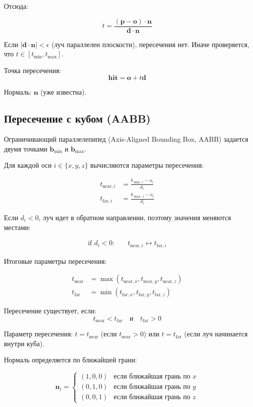 \documentclass[14pt, a4paper]{extarticle}
\begin{document}
Отсюда:

\[
t = \frac{(\mathbf{p} - \mathbf{o}) \cdot \mathbf{n}}{\mathbf{d} \cdot \mathbf{n}}
\]

Если $|\mathbf{d} \cdot \mathbf{n}| < \epsilon$ (луч параллелен плоскости), пересечения нет. Иначе проверяется, что $t \in [t_{\min}, t_{\max}]$.

Точка пересечения:
\[
\mathbf{hit} = \mathbf{o} + t\mathbf{d}
\]

Нормаль: $\mathbf{n}$ (уже известна).

\subsection{Пересечение с кубом (AABB)}

Ограничивающий параллелепипед (Axis-Aligned Bounding Box, AABB) задается двумя точками $\mathbf{b}_{\min}$ и $\mathbf{b}_{\max}$.

Для каждой оси $i \in \{x, y, z\}$ вычисляются параметры пересечения:

\begin{align}
t_{\text{near},i} &= \frac{b_{\min,i} - o_i}{d_i} \\
t_{\text{far},i} &= \frac{b_{\max,i} - o_i}{d_i}
\end{align}

Если $d_i < 0$, луч идет в обратном направлении, поэтому значения меняются местами:

\begin{align}
\text{if } d_i < 0: \quad &t_{\text{near},i} \leftrightarrow t_{\text{far},i}
\end{align}

Итоговые параметры пересечения:

\begin{align}
t_{\text{near}} &= \max(t_{\text{near},x}, t_{\text{near},y}, t_{\text{near},z}) \\
t_{\text{far}} &= \min(t_{\text{far},x}, t_{\text{far},y}, t_{\text{far},z})
\end{align}

Пересечение существует, если:
\[
t_{\text{near}} < t_{\text{far}} \quad \text{и} \quad t_{\text{far}} > 0
\]

Параметр пересечения: $t = t_{\text{near}}$ (если $t_{\text{near}} > 0$) или $t = t_{\text{far}}$ (если луч начинается внутри куба).

Нормаль определяется по ближайшей грани:

\[
\mathbf{n}_i = \begin{cases}
(1, 0, 0) & \text{если ближайшая грань по } x \\
(0, 1, 0) & \text{если ближайшая грань по } y \\
(0, 0, 1) & \text{если ближайшая грань по } z
\end{cases}
\]
\end{document}
